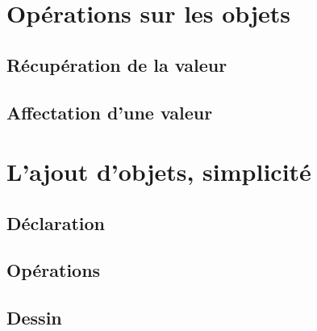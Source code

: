 \documentclass[11pt]{report} %
\begin{document}
\section{Opérations sur les objets}
\subsection{Récupération de la valeur}
\subsection{Affectation d'une valeur}

\section{L'ajout d'objets, simplicité}
\subsection{Déclaration}
\subsection{Opérations}
\subsection{Dessin}
\end{document}
